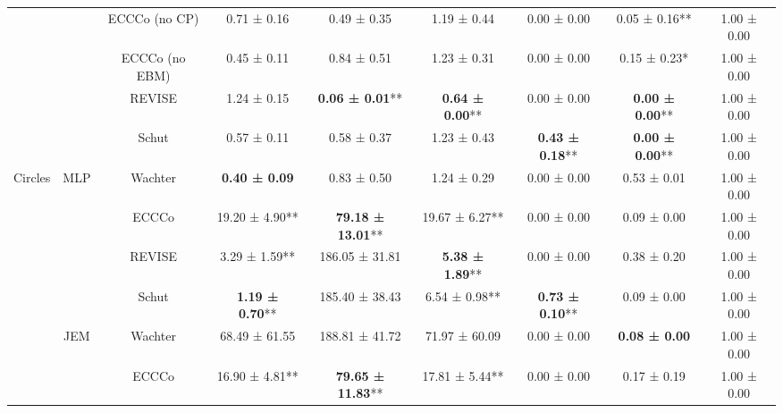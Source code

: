 \begin{table}
{\begin{tabular}[t]{ccccccccc}
 &  & ECCCo (no CP) & 0.71 ± 0.16\hphantom{*}\hphantom{*} & 0.49 ± 0.35\hphantom{*}\hphantom{*} & 1.19 ± 0.44\hphantom{*}\hphantom{*} & 0.00 ± 0.00\hphantom{*}\hphantom{*} & 0.05 ± 0.16** & 1.00 ± 0.00\hphantom{*}\hphantom{*}\\

 &  & ECCCo (no EBM) & 0.45 ± 0.11\hphantom{*}\hphantom{*} & 0.84 ± 0.51\hphantom{*}\hphantom{*} & 1.23 ± 0.31\hphantom{*}\hphantom{*} & 0.00 ± 0.00\hphantom{*}\hphantom{*} & 0.15 ± 0.23*\hphantom{*} & 1.00 ± 0.00\hphantom{*}\hphantom{*}\\

 &  & REVISE & 1.24 ± 0.15\hphantom{*}\hphantom{*} & \textbf{0.06 ± 0.01}** & \textbf{0.64 ± 0.00}** & 0.00 ± 0.00\hphantom{*}\hphantom{*} & \textbf{0.00 ± 0.00}** & 1.00 ± 0.00\hphantom{*}\hphantom{*}\\

 &  & Schut & 0.57 ± 0.11\hphantom{*}\hphantom{*} & 0.58 ± 0.37\hphantom{*}\hphantom{*} & 1.23 ± 0.43\hphantom{*}\hphantom{*} & \textbf{0.43 ± 0.18}** & \textbf{0.00 ± 0.00}** & 1.00 ± 0.00\hphantom{*}\hphantom{*}\\

\multirow[t]{-12}{*}{\centering\arraybackslash Circles} & \multirow[t]{-6}{*}{\centering\arraybackslash MLP} & Wachter & \textbf{0.40 ± 0.09}\hphantom{*}\hphantom{*} & 0.83 ± 0.50\hphantom{*}\hphantom{*} & 1.24 ± 0.29\hphantom{*}\hphantom{*} & 0.00 ± 0.00\hphantom{*}\hphantom{*} & 0.53 ± 0.01\hphantom{*}\hphantom{*} & 1.00 ± 0.00\hphantom{*}\hphantom{*}\\
\cmidrule{1-9}
 &  & ECCCo & 19.20 ± 4.90** & \textbf{79.18 ± 13.01}** & 19.67 ± 6.27** & 0.00 ± 0.00\hphantom{*}\hphantom{*} & 0.09 ± 0.00\hphantom{*}\hphantom{*} & 1.00 ± 0.00\hphantom{*}\hphantom{*}\\

 &  & REVISE & 3.29 ± 1.59** & 186.05 ± 31.81\hphantom{*}\hphantom{*} & \textbf{5.38 ± 1.89}** & 0.00 ± 0.00\hphantom{*}\hphantom{*} & 0.38 ± 0.20\hphantom{*}\hphantom{*} & 1.00 ± 0.00\hphantom{*}\hphantom{*}\\

 &  & Schut & \textbf{1.19 ± 0.70}** & 185.40 ± 38.43\hphantom{*}\hphantom{*} & 6.54 ± 0.98** & \textbf{0.73 ± 0.10}** & 0.09 ± 0.00\hphantom{*}\hphantom{*} & 1.00 ± 0.00\hphantom{*}\hphantom{*}\\

 & \multirow[t]{-4}{*}{\centering\arraybackslash JEM} & Wachter & 68.49 ± 61.55\hphantom{*}\hphantom{*} & 188.81 ± 41.72\hphantom{*}\hphantom{*} & 71.97 ± 60.09\hphantom{*}\hphantom{*} & 0.00 ± 0.00\hphantom{*}\hphantom{*} & \textbf{0.08 ± 0.00}\hphantom{*}\hphantom{*} & 1.00 ± 0.00\hphantom{*}\hphantom{*}\\
\cmidrule{2-9}
 &  & ECCCo & 16.90 ± 4.81** & \textbf{79.65 ± 11.83}** & 17.81 ± 5.44** & 0.00 ± 0.00\hphantom{*}\hphantom{*} & 0.17 ± 0.19\hphantom{*}\hphantom{*} & 1.00 ± 0.00\hphantom{*}\hphantom{*}\\


\end{tabular}}
\end{table}
